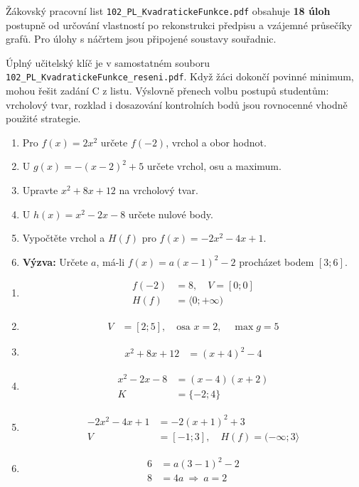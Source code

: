 \documentclass[11pt,a4paper]{article}
\begin{document}
Žákovský pracovní list \texttt{102\_PL\_KvadratickeFunkce.pdf} obsahuje \textbf{18 úloh} postupně od určování vlastností po rekonstrukci předpisu a vzájemné průsečíky grafů. Pro úlohy s náčrtem jsou připojené soustavy souřadnic. \par
Úplný učitelský klíč je v samostatném souboru \texttt{102\_PL\_KvadratickeFunkce\_reseni.pdf}.
Když žáci dokončí povinné minimum, mohou řešit zadání C z listu. Výslovně přenech volbu postupů studentům: vrcholový tvar, rozklad i dosazování kontrolních bodů jsou rovnocenné vhodně použité strategie.
\begin{zadaniReseniBox}[title={Domácí úkol}]
\begin{enumerate}[label=\alph*),itemsep=3pt]
\item Pro $f(x)=2x^2$ určete $f(-2)$, vrchol a obor hodnot.
\item U $g(x)=-(x-2)^2+5$ určete vrchol, osu a maximum.
\item Upravte $x^2+8x+12$ na vrcholový tvar.
\item U $h(x)=x^2-2x-8$ určete nulové body.
\item Vypočtěte vrchol a $H(f)$ pro $f(x)=-2x^2-4x+1$.
\item \textbf{Výzva:} Určete $a$, má-li $f(x)=a(x-1)^2-2$ procházet bodem $[3;6]$.
\end{enumerate}
\tcblower
\begin{enumerate}[label=\alph*),itemsep=4pt]
\item
\[
\begin{aligned}
f(-2)&=8,\quad V=[0;0] \\
H(f)&=\langle0;+\infty)
\end{aligned}
\]

\item
\[
\begin{aligned}
V&=[2;5],\quad\text{osa }x=2,\quad\max g=5
\end{aligned}
\]

\item
\[
\begin{aligned}
x^2+8x+12&=(x+4)^2-4
\end{aligned}
\]

\item
\[
\begin{aligned}
x^2-2x-8&=(x-4)(x+2) \\
K&=\{-2;4\}
\end{aligned}
\]

\item
\[
\begin{aligned}
-2x^2-4x+1&=-2(x+1)^2+3 \\
V&=[-1;3],\quad H(f)=(-\infty;3\rangle
\end{aligned}
\]

\item
\[
\begin{aligned}
6&=a(3-1)^2-2 \\
8&=4a\ \Rightarrow\ a=2
\end{aligned}
\]

\end{enumerate}
\end{zadaniReseniBox}
\end{document}
